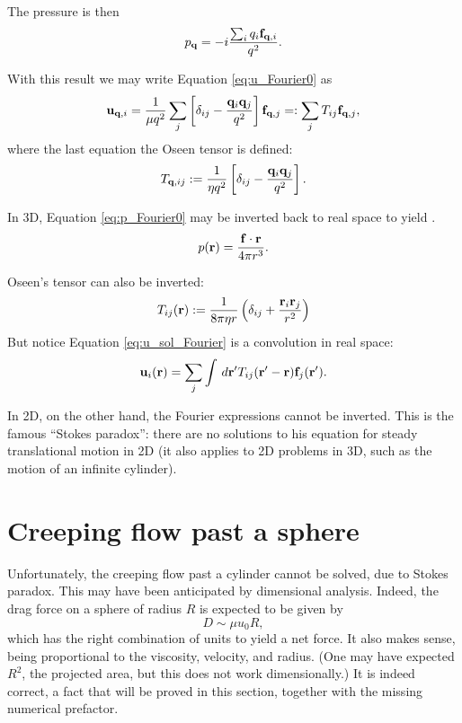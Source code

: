 The pressure is then
\begin{equation}
\label{eq:p_Fourier0}
p_{\mathbf{q}} = -i \frac{\sum_i q_i\mathbf{f}_{\mathbf{q},i} }{q^2} .
\end{equation}

With this result we may write Equation \ref{eq:u_Fourier0} as
\begin{equation}
\label{eq:u_sol_Fourier}
\mathbf{u}_{\mathbf{q},i} = \frac 1{\mu q^2}
\sum_j
\left[ \delta_{ij} - \frac{ \mathbf{q}_i  \mathbf{q}_j}{q^2} \right]
\mathbf{f}_{\mathbf{q},j} =: \sum_j T_{ij} \mathbf{f}_{\mathbf{q},j},
\end{equation}
%
where the last equation the Oseen tensor is defined:
\[
T_{\mathbf{q},ij} := \frac 1{\eta q^2} \left[
  \delta_{ij} - \frac{ \mathbf{q}_i  \mathbf{q}_j}{q^2} 
\right].
\]

In 3D, Equation \ref{eq:p_Fourier0} may be inverted back to real space
to yield \cite{pozrikidis2011introduction}.
\[
p(\mathbf{r}) = \frac{\mathbf{f}\cdot\mathbf{r}}{4\pi r^3} .
\]

Oseen's tensor can also be inverted:
\[
T_{ij}(\mathbf{r}) :=  \frac 1{8\pi \eta r} 
\left(
  \delta_{ij} + \frac{ \mathbf{r}_i  \mathbf{r}_j}{r^2}
\right)
\]
But notice Equation \ref{eq:u_sol_Fourier} is a convolution in
real space:
\begin{equation}
\label{eq:u_sol_real}
\mathbf{u}_i(\mathbf{r}) =  \sum_j \int \,d\mathbf{r}' T_{ij}(\mathbf{r}'-\mathbf{r}) \mathbf{f}_j(\mathbf{r}') .
\end{equation}

In 2D, on the other hand, the Fourier expressions cannot be
inverted. This is the famous ``Stokes paradox'': there are no solutions to his equation for steady
translational motion in 2D (it also applies to 2D problems in 3D, such
as the motion of an infinite cylinder).




\section{Creeping flow past a sphere}

Unfortunately, the creeping flow past a cylinder cannot be solved, due
to Stokes paradox. This may have been anticipated by dimensional
analysis. Indeed, the drag force on a sphere of radius $R$ is expected
to be given by
\begin{equation}
  \label{eq:drag_sphere_guess}
  D \sim \mu u_0 R ,
\end{equation}
%
which has the right combination of units to yield a net force. It also
makes sense, being proportional to the viscosity, velocity, and
radius. (One may have expected $R^2$, the projected area, but this
does not work dimensionally.) It is indeed correct, a fact that will
be proved in this section, together with the missing numerical
prefactor.

